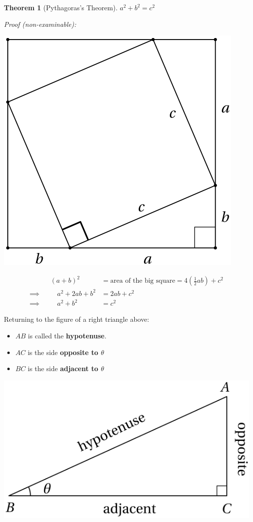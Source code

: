 \documentclass[
  12pt,
  oneside]{book}
\providecommand{\tightlist}{%
  \setlength{\itemsep}{0pt}\setlength{\parskip}{0pt}}
\newtheorem{theorem}{Theorem}[chapter]
\theoremstyle{definition}
\theoremstyle{definition}
\theoremstyle{definition}
\theoremstyle{definition}
\theoremstyle{remark}
\begin{document}
\begin{theorem}[Pythagoras's Theorem]
\(a^2+b^2=c^2\)
\end{theorem}

\emph{Proof (non-examinable):}

\begin{center}\includegraphics{t15-pythagoras} \end{center}

\begin{align*}
&&(a+b)^2 &= \text{area of the big square} = 4\left(\frac12ab\right) + c^2\\
\implies&&\quad a^2+2ab+b^2 &= 2ab+c^2\\
\implies&&\quad a^2+b^2&=c^2
\end{align*}

Returning to the figure of a right triangle above:

\begin{itemize}
\tightlist
\item
  \(AB\) is called the \textbf{hypotenuse}.
\item
  \(AC\) is the side \textbf{opposite to \(\theta\)}
\item
  \(BC\) is the side \textbf{adjacent to \(\theta\)}
\end{itemize}

\begin{center}\includegraphics{t15-rtriangle2} \end{center}
\end{document}
